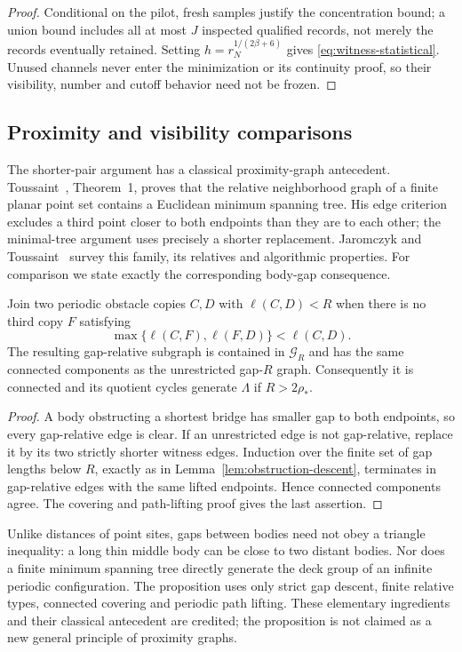 \begin{proof}
Conditional on the pilot, fresh samples justify the concentration bound;
a union bound includes all at most $J$ inspected qualified records,
not merely the records eventually retained. Setting
$h=r_N^{1/(2\beta+6)}$ gives \eqref{eq:witness-statistical}. Unused
channels never enter the minimization or its continuity proof, so their
visibility, number and cutoff behavior need not be frozen.
\end{proof}

\subsection{Proximity and visibility comparisons}
The shorter-pair argument has a classical proximity-graph antecedent.
Toussaint~\cite{Toussaint}, Theorem~1, proves that the relative
neighborhood graph of a finite planar point set contains a Euclidean
minimum spanning tree. His edge criterion excludes a third point closer
to both endpoints than they are to each other; the minimal-tree argument
uses precisely a shorter replacement. Jaromczyk and Toussaint~\cite{JT}
survey this family, its relatives and algorithmic properties.
For comparison we state exactly the corresponding body-gap consequence.

\begin{proposition}\label{prop:gap-relative}
Join two periodic obstacle copies $C,D$ with $\ell(C,D)<R$ when
there is no third copy $F$ satisfying
\[
                  \max\{\ell(C,F),\ell(F,D)\}<\ell(C,D).
\]
The resulting gap-relative subgraph is contained in $\mathcal G_R$ and
has the same connected components as the unrestricted gap-$R$ graph.
Consequently it is connected and its quotient cycles generate $\Lambda$
if $R>2\rho_*$.
\end{proposition}
\begin{proof}
A body obstructing a shortest bridge has smaller gap to both endpoints,
so every gap-relative edge is clear. If an unrestricted edge is not
gap-relative, replace it by its two strictly shorter witness edges.
Induction over the finite set of gap lengths below $R$, exactly as in
Lemma~\ref{lem:obstruction-descent}, terminates in gap-relative edges
with the same lifted endpoints. Hence connected components agree.
The covering and path-lifting proof gives the last assertion.
\end{proof}

Unlike distances of point sites, gaps between bodies need not obey a
triangle inequality: a long thin middle body can be close to two distant
bodies. Nor does a finite minimum spanning tree directly generate the
deck group of an infinite periodic configuration. The proposition uses
only strict gap descent, finite relative types, connected covering and
periodic path lifting. These elementary ingredients and their classical
antecedent are credited; the proposition is not claimed as a new general
principle of proximity graphs.


